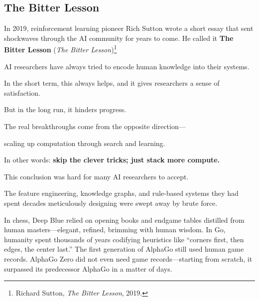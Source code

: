 
\subsection*{The Bitter Lesson}
In 2019, reinforcement learning pioneer Rich Sutton wrote a short essay that sent shockwaves through the AI community for years to come. He called it \textbf{The Bitter Lesson} (\textit{The Bitter Lesson})\footnote{Richard Sutton, \textit{The Bitter Lesson}, 2019.}

\begin{myquote}
AI researchers have always tried to encode human knowledge into their systems.

In the short term, this always helps, and it gives researchers a sense of satisfaction.

But in the long run, it hinders progress.

The real breakthroughs come from the opposite direction---

scaling up computation through search and learning.
\end{myquote}

In other words: \textbf{skip the clever tricks; just stack more compute.}

\vspace{1em}

This conclusion was hard for many AI researchers to accept.

The feature engineering, knowledge graphs, and rule-based systems they had spent decades meticulously designing were swept away by brute force.

\vspace{1em}

In chess, Deep Blue relied on opening books and endgame tables distilled from human masters---elegant, refined, brimming with human wisdom. In Go, humanity spent thousands of years codifying heuristics like ``corners first, then edges, the center last.'' The first generation of AlphaGo still used human game records. AlphaGo Zero did not even need game records---starting from scratch, it surpassed its predecessor AlphaGo in a matter of days.

\vspace{1em}


